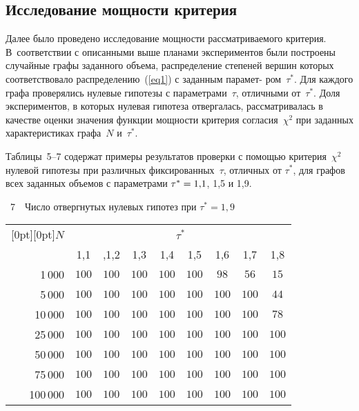\begin{multicols}{2}


\section{Исследование мощности критерия}

Далее было проведено исследование мощ\-ности рассматриваемого
критерия. В~соответствии с описанными выше планами экспериментов
были\linebreak
построены случайные графы заданного объема, распределение
степеней вершин которых соответствовало распределению~(\ref{eq1})
с заданным па\-ра\-мет-\linebreak
\noindent
ром~$\tau^*$. Для каждого графа проверялись
нулевые гипотезы с параметрами~$\tau$, отличными от~$\tau^*$.
Доля экспериментов, в которых нулевая гипотеза отвергалась,
рассматривалась в качестве оценки значения функции мощности
критерия согласия~$\chi^2$ при заданных характеристиках графа~$N$
и~$\tau^*$.

Таблицы~5--7 содержат примеры результатов проверки с помощью
критерия~$\chi^2$ нулевой гипотезы при различных фиксированных~$\tau$, 
отличных от $\tau^*$, для графов всех заданных объемов с
пара\-мет\-рами $\tau^*\hm= 1{,}1$, 1,5 и 1,9.



\noindent
{{\tablename~7}\ \ \small{Число отвергнутых нулевых гипотез при $\tau^*=1{,}9$}}

\vspace*{6pt}

\begin{center}
{\small 
\tabcolsep=4.8pt
\begin{tabular}{|r|c|c|c|c|c|c|c|c|}
\hline
\multicolumn{1}{|c|}{\raisebox{-6pt}[0pt][0pt]{$N$}} &\multicolumn{8}{c|}{$\tau^*$}\\
\cline{2-9}
& 1,1 & ,1,2 & 1,3 & 1,4 & 1,5 & 1,6 & 1,7 & 1,8 \\ 
\hline
1\,000 & $100$ & $100$ & $100$ & $100$ & $100$ & \hphantom{9}$98$ & \hphantom{9}$56$ & \hphantom{9}$15$ \\
5\,000 & $100$ & $100$ & $100$ & $100$ & $100$ & $100$ & $100$ & \hphantom{9}$44$ \\
10\,000 & $100$ & $100$ & $100$ & $100$ & $100$ & $100$ & $100$ & \hphantom{9}$78$ \\
25\,000 & $100$ & $100$ & $100$ & $100$ & $100$ & $100$ & $100$ & $100$ \\
50\,000 & $100$ & $100$ & $100$ & $100$ & $100$ & $100$ & $100$ & $100$ \\
75\,000 & $100$ & $100$ & $100$ & $100$ & $100$ & $100$ & $100$ & $100$ \\
100\,000 & $100$ & $100$ & $100$ & $100$ & $100$ & $100$ & $100$ & $100$ \\ \hline
\end{tabular}
}
\end{center}


\end{multicols}
